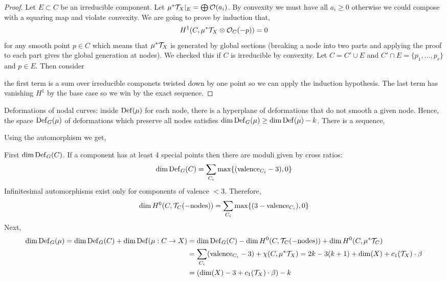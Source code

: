 \documentclass[12pt]{article}
\begin{document}
\begin{proof}
Let $E \subset C$ be an irreducible component. Let $\mu^* \mathcal{T}_X |_E = \bigoplus \mathcal{O}_{}(a_i)$. By convexity we must have all $a_i \ge 0$ otherwise we could compose with a squaring map and violate convexity. We are going to prove by induction that,
\[ H^1(C, \mu^* \mathcal{T}_X \otimes \mathcal{O}_{C}(-p)) = 0 \]
for any smooth point $p \in C$ which means that $\mu^* \mathcal{T}_X$ is generated by global sections (breaking a node into two parts and applying the proof to each part gives the global generation at nodes). We checked this if $C$ is irreducible by convexity. Let $C = C' \cup E$ and $C' \cap E = \{ p_1, \dots, p_r \}$ and $p \in E$. Then consider
\begin{center}
\end{center}
the first term is a sum over irreducible componets twisted down by one point so we can apply the induction hypothesis. The last term has vanishing $H^1$ by the base case so we win by the exact sequence. 
\end{proof}

Deformations of nodal curves: inside $\mathrm{Def}(\mu)$ for each node, there is a hyperplane of deformations that do not smooth a given node. Hence, the space $\mathrm{Def}_G(\mu)$ of deformations which preserve all nodes satisfies $\dim{\mathrm{Def}_G(\mu)} \ge \dim{\mathrm{Def}(\mu)} - k$. There is a sequence,
\begin{center}
\end{center}
Using the automorphism we get,
\begin{center}
\end{center}
First $\dim{\mathrm{Def}_G(C)}$. If a component has at least 4 special points then there are moduli given by cross ratios:
\[ \dim{\mathrm{Def}_G(C)} = \sum_{C_i} \max \{ ( \text{valence}_{C_i} - 3 ), 0 \} \]
Infinitesimal automorphisms exist only for components of valence $< 3$. Therefore,
\[ \dim H^0(C, \mathcal{T}_C(-\text{nodes})) = \sum_{C_i} \max \{ (3 - \text{valence}_{C_i}), 0 \} \]
Next,
\begin{align*}
\dim \mathrm{Def}_G(\mu) = \dim \mathrm{Def}_G(C) + \dim \mathrm{Def}(\mu : C \to X) & = \dim \mathrm{Def}_G(C) - \dim H^0(C, \mathcal{T}_C(-\text{nodes})) + \dim H^0(C, \mu^* \mathcal{T}_C) 
\\
& = \sum_{C_i} (\text{valence}_{C_i} - 3) + \chi(C, \mu^* \mathcal{T}_X) = 2 k - 3 (k + 1) + \dim(X) + c_1(\mathcal{T}_X) \cdot \beta 
\\
& = (\dim(X) - 3 + c_1(\mathcal{T}_X) \cdot \beta) - k
\end{align*}
\end{document}
